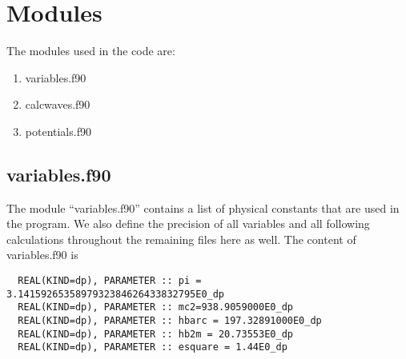 \documentclass[11pt]{report}
\begin{document}
\chapter{Modules}
The modules used in the code are:
\begin{enumerate}
\item variables.f90
\item calcwaves.f90
\item potentials.f90
\end{enumerate}
\section{variables.f90}
The module ``variables.f90'' contains a list of physical constants that are used in the program. We also define the precision of all variables and all following calculations throughout the remaining files here as well. The content of variables.f90 is
\begin{verbatim}
  REAL(KIND=dp), PARAMETER :: pi = 3.1415926535897932384626433832795E0_dp
  REAL(KIND=dp), PARAMETER :: mc2=938.9059000E0_dp
  REAL(KIND=dp), PARAMETER :: hbarc = 197.32891000E0_dp
  REAL(KIND=dp), PARAMETER :: hb2m = 20.73553E0_dp
  REAL(KIND=dp), PARAMETER :: esquare = 1.44E0_dp
\end{verbatim}
\end{document}
